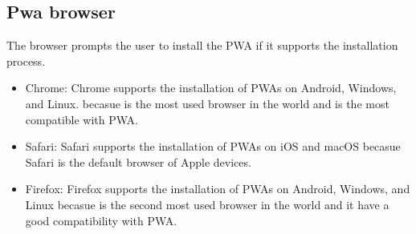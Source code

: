 \documentclass[12pt,a4paper, twosite]{article}
\begin{document}
\subsection{Pwa browser}
\label{sec:orgaf51da6}

The browser prompts the user to install the PWA if it supports the installation process.
\begin{itemize}

  \item Chrome: Chrome supports the installation of PWAs on Android, Windows, and Linux. becasue is the most used browser in the world and is the most compatible with PWA.
  
  \item Safari: Safari supports the installation of PWAs on iOS and macOS becasue Safari is the default browser of Apple devices.
  
  \item Firefox: Firefox supports the installation of PWAs on Android, Windows, and Linux becasue is the second most used browser in the world and it have a good compatibility with PWA.

  
\end{itemize}
\end{document}
